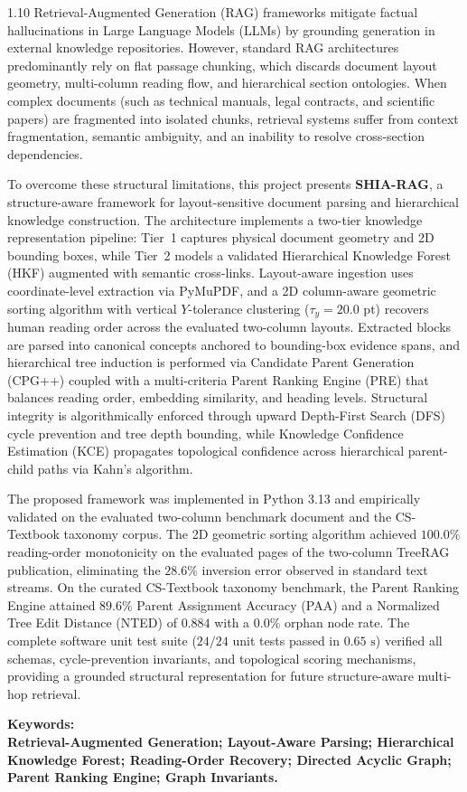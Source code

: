 \documentclass[12pt,a4paper]{report}
\begin{document}
\begin{spacing}{1.10}
\noindent
Retrieval-Augmented Generation (RAG) frameworks mitigate factual hallucinations in Large Language Models (LLMs) by grounding generation in external knowledge repositories. However, standard RAG architectures predominantly rely on flat passage chunking, which discards document layout geometry, multi-column reading flow, and hierarchical section ontologies. When complex documents (such as technical manuals, legal contracts, and scientific papers) are fragmented into isolated chunks, retrieval systems suffer from context fragmentation, semantic ambiguity, and an inability to resolve cross-section dependencies.

To overcome these structural limitations, this project presents \textbf{SHIA-RAG}, a structure-aware framework for layout-sensitive document parsing and hierarchical knowledge construction. The architecture implements a two-tier knowledge representation pipeline: Tier~1 captures physical document geometry and 2D bounding boxes, while Tier~2 models a validated Hierarchical Knowledge Forest (HKF) augmented with semantic cross-links. Layout-aware ingestion uses coordinate-level extraction via PyMuPDF, and a 2D column-aware geometric sorting algorithm with vertical $Y$-tolerance clustering ($\tau_y = 20.0\text{ pt}$) recovers human reading order across the evaluated two-column layouts. Extracted blocks are parsed into canonical concepts anchored to bounding-box evidence spans, and hierarchical tree induction is performed via Candidate Parent Generation (CPG++) coupled with a multi-criteria Parent Ranking Engine (PRE) that balances reading order, embedding similarity, and heading levels. Structural integrity is algorithmically enforced through upward Depth-First Search (DFS) cycle prevention and tree depth bounding, while Knowledge Confidence Estimation (KCE) propagates topological confidence across hierarchical parent-child paths via Kahn's algorithm.

The proposed framework was implemented in Python 3.13 and empirically validated on the evaluated two-column benchmark document and the CS-Textbook taxonomy corpus. The 2D geometric sorting algorithm achieved $100.0\%$ reading-order monotonicity on the evaluated pages of the two-column TreeRAG publication, eliminating the $28.6\%$ inversion error observed in standard text streams. On the curated CS-Textbook taxonomy benchmark, the Parent Ranking Engine attained $89.6\%$ Parent Assignment Accuracy (PAA) and a Normalized Tree Edit Distance (NTED) of $0.884$ with a $0.0\%$ orphan node rate. The complete software unit test suite ($24/24$ unit tests passed in $0.65\text{ s}$) verified all schemas, cycle-prevention invariants, and topological scoring mechanisms, providing a grounded structural representation for future structure-aware multi-hop retrieval.

\vspace{3mm}
\noindent\textbf{Keywords:} \\
{\bfseries Retrieval-Augmented Generation; Layout-Aware Parsing; Hierarchical Knowledge Forest; Reading-Order Recovery; Directed Acyclic Graph; Parent Ranking Engine; Graph Invariants.}
\end{spacing}
\clearpage
\end{document}
